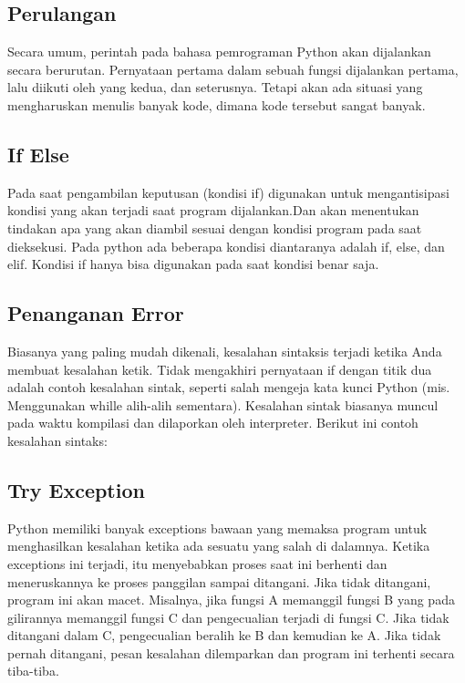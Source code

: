 \begin{enumerate}
\subsection{Perulangan}
Secara umum, perintah pada bahasa pemrograman Python akan dijalankan secara berurutan. Pernyataan pertama dalam sebuah fungsi dijalankan pertama, lalu diikuti oleh yang kedua, dan seterusnya. Tetapi akan ada situasi  yang mengharuskan menulis banyak kode, dimana kode tersebut sangat banyak.

\subsection{If Else}
Pada saat pengambilan keputusan (kondisi if) digunakan untuk mengantisipasi kondisi yang akan terjadi saat program dijalankan.Dan akan menentukan tindakan apa yang akan diambil sesuai dengan kondisi program pada saat dieksekusi. Pada python ada beberapa kondisi diantaranya adalah if, else, dan elif. Kondisi if hanya bisa digunakan pada saat kondisi benar saja.

\subsection{Penanganan Error}
Biasanya yang paling mudah dikenali, kesalahan sintaksis terjadi ketika Anda membuat kesalahan ketik. Tidak mengakhiri pernyataan if dengan titik dua adalah contoh kesalahan sintak, seperti salah mengeja kata kunci Python (mis. Menggunakan whille alih-alih sementara). Kesalahan sintak biasanya muncul pada waktu kompilasi dan dilaporkan oleh interpreter. 
Berikut ini contoh kesalahan sintaks:

\subsection{Try Exception}
Python memiliki banyak exceptions bawaan yang memaksa program untuk menghasilkan kesalahan ketika ada sesuatu yang salah di dalamnya. Ketika exceptions ini terjadi, itu menyebabkan proses saat ini berhenti dan meneruskannya ke proses panggilan sampai ditangani. Jika tidak ditangani, program ini akan macet.
Misalnya, jika fungsi A memanggil fungsi B yang pada gilirannya memanggil fungsi C dan pengecualian terjadi di fungsi C. Jika tidak ditangani dalam C, pengecualian beralih ke B dan kemudian ke A. Jika tidak pernah ditangani, pesan kesalahan dilemparkan dan program ini terhenti secara tiba-tiba.

\end{enumerate}
